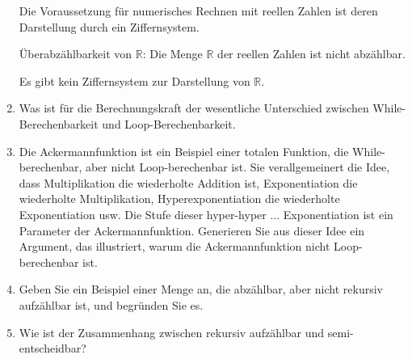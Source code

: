 \documentclass{lehramt-informatik-aufgabe}
\begin{document}
\begin{enumerate}
\begin{liAntwort}
Die Voraussetzung für numerisches Rechnen mit reellen Zahlen ist deren
Darstellung durch ein Ziffernsystem.

Überabzählbarkeit von $\mathbb{R}$: Die Menge $\mathbb{R}$ der reellen
Zahlen ist nicht abzählbar.

Es gibt kein Ziffernsystem zur Darstellung von $\mathbb{R}$.

\end{liAntwort}


\item Was ist für die Berechnungskraft der wesentliche Unterschied
zwischen While-Berechenbarkeit und Loop-Berechenbarkeit.


\item Die Ackermannfunktion ist ein Beispiel einer totalen Funktion, die
While-berechenbar, aber nicht Loop-berechenbar ist. Sie verallgemeinert
die Idee, dass Multiplikation die wiederholte Addition ist,
Exponentiation die wiederholte Multiplikation, Hyperexponentiation die
wiederholte Exponentiation usw. Die Stufe dieser hyper-hyper ...
Exponentiation ist ein Parameter der Ackermannfunktion. Generieren Sie
aus dieser Idee ein Argument, das illustriert, warum die
Ackermannfunktion nicht Loop-berechenbar ist.


\item Geben Sie ein Beispiel einer Menge an, die abzählbar, aber nicht
rekursiv aufzählbar ist, und begründen Sie es.


\item Wie ist der Zusammenhang zwischen rekursiv aufzählbar und
semi-entscheidbar?

\end{enumerate}
\end{document}
